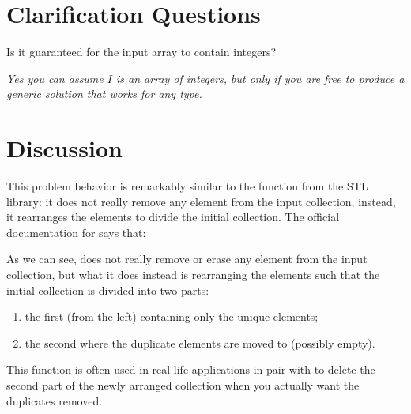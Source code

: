 \section{Clarification Questions}

\begin{QandA}
	\item Is it guaranteed for the input array to contain integers? 
	\begin{answered}
		\textit{Yes you can assume $I$ is an array of integers, but only if you are free to produce a generic solution that works for any type.}
	\end{answered}	
\end{QandA}

\section{Discussion}
\label{remove_duplicated_sorted_array_inplace:sec:discussion}
This problem behavior is remarkably similar to the function  from the STL library: it does not really remove any element from the input collection, instead, it rearranges the elements to divide the initial collection. 
The official documentation for  says that:


As we can see,  does not really remove or erase any element from the input collection, but
what it does instead is rearranging the elements such that the initial collection is divided into
two parts:
\begin{enumerate}
	\item the first (from the left) containing only the unique elements;
	\item the second where the duplicate elements are moved to (possibly empty).
\end{enumerate}


This function is often used in real-life applications in pair with \href{https://en.cppreference.com/w/cpp/container/vector/erase2}{} to delete the second part of the newly
arranged collection when you actually want the duplicates removed.

